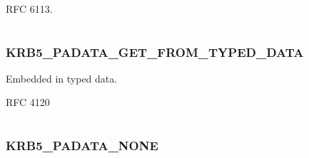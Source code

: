 \documentclass[letterpaper,10pt,english]{sphinxmanual}
\begin{document}
\begin{fulllineitems}
\label{appdev/refs/macros/KRB5_PADATA_FX_FAST:KRB5_PADATA_FX_FAST}
\end{fulllineitems}


RFC 6113.

\begin{tabulary}{\linewidth}{|L|L|}
\hline

 & 
\\
\hline\end{tabulary}



\subsubsection{KRB5\_PADATA\_GET\_FROM\_TYPED\_DATA}
\label{appdev/refs/macros/KRB5_PADATA_GET_FROM_TYPED_DATA:krb5-padata-get-from-typed-data-data}\label{appdev/refs/macros/KRB5_PADATA_GET_FROM_TYPED_DATA::doc}\label{appdev/refs/macros/KRB5_PADATA_GET_FROM_TYPED_DATA:krb5-padata-get-from-typed-data}

\begin{fulllineitems}
\label{appdev/refs/macros/KRB5_PADATA_GET_FROM_TYPED_DATA:KRB5_PADATA_GET_FROM_TYPED_DATA}
\end{fulllineitems}


Embedded in typed data.

RFC 4120

\begin{tabulary}{\linewidth}{|L|L|}
\hline

 & 
\\
\hline\end{tabulary}



\subsubsection{KRB5\_PADATA\_NONE}
\label{appdev/refs/macros/KRB5_PADATA_NONE:krb5-padata-none-data}\label{appdev/refs/macros/KRB5_PADATA_NONE:krb5-padata-none}\label{appdev/refs/macros/KRB5_PADATA_NONE::doc}

\begin{fulllineitems}
\label{appdev/refs/macros/KRB5_PADATA_NONE:KRB5_PADATA_NONE}
\end{fulllineitems}
\end{document}

